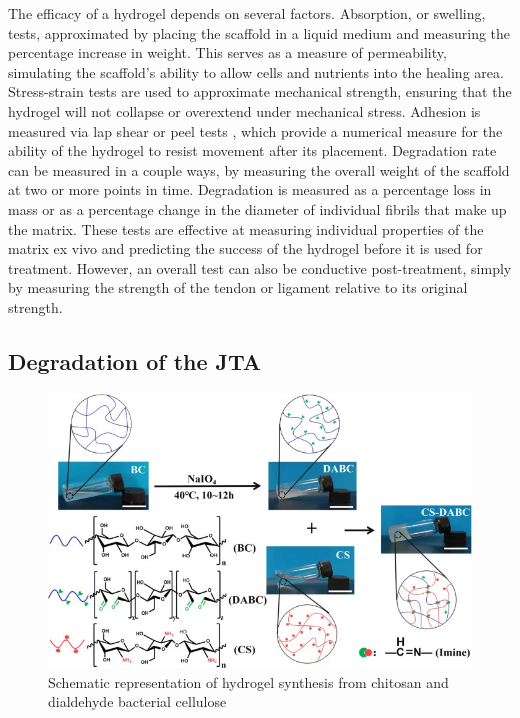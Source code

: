 The efficacy of a hydrogel depends on several factors. Absorption, or swelling, tests,
approximated by placing the scaffold in a liquid medium and measuring the percentage increase
in weight. This serves as a measure of permeability, simulating the scaffold's ability to allow cells
and nutrients into the healing area. Stress-strain tests are used to approximate mechanical
strength, ensuring that the hydrogel will not collapse or overextend under mechanical stress.
Adhesion is measured via lap shear or peel tests \autocite{RN5}, which provide a numerical
measure for the ability of the hydrogel to resist movement after its placement. Degradation rate
can be measured in a couple ways, by measuring the overall weight of the scaffold at two or more
points in time. Degradation is measured as a percentage loss in mass or as a
percentage change in the diameter of individual fibrils that make up the matrix. These tests are
effective at measuring individual properties of the matrix ex vivo and predicting the success of
the hydrogel before it is used for treatment. However, an overall test can also be conductive
post-treatment, simply by measuring the strength of the tendon or ligament relative to its original
strength.

\subsection{Degradation of the JTA}

\begin{figure}[b]
    \centering 
    \includegraphics[width=0.7\linewidth]{Figures/CS_DABC_condensation.jpg}
    \caption{Schematic representation of hydrogel synthesis from chitosan and dialdehyde bacterial cellulose \autocite{liAllnaturalInjectableHydrogel2020}}
    \label{fig:CS_DABC_condensation}
\end{figure}

